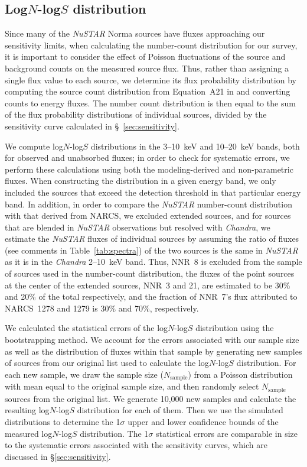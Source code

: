 \documentclass[iop,revtex4]{emulateapj}
\begin{document}
\subsection{Log$N$-log$S$ distribution}
\label{sec:lognlogs}
Since many of the \textit{NuSTAR} Norma sources have fluxes approaching our sensitivity limits, when calculating the number-count distribution for our survey, it is important to consider the effect of Poisson fluctuations of the source and background counts on the measured source flux.  Thus, rather than assigning a single flux value to each source, we determine its flux probability distribution by computing the source count distribution from Equation~A21 in \citet{weiss07} and converting counts to energy fluxes.  The number count distribution is then equal to the sum of the flux probability distributions of individual sources, divided by the sensitivity curve calculated in \S~\ref{sec:sensitivity}.  \par
We compute log$N$-log$S$ distributions in the 3--10~keV and 10--20~keV bands, both for observed and unabsorbed fluxes; in order to check for systematic errors, we perform these calculations using both the modeling-derived and non-parametric fluxes.  When constructing the distribution in a given energy band, we only included the sources that exceed the detection threshold in that particular energy band.  In addition, in order to compare the \textit{NuSTAR} number-count distribution with that derived from NARCS, we excluded extended sources, and for sources that are blended in \textit{NuSTAR} observations but resolved with \textit{Chandra}, we estimate the \textit{NuSTAR} fluxes of individual sources by assuming the ratio of fluxes (see comments in Table~\ref{tab:spectra}) of the two sources is the same in \textit{NuSTAR} as it is in the \textit{Chandra} 2--10~keV band.  Thus, NNR~8 is excluded from the sample of sources used in the number-count distribution, the fluxes of the point sources at the center of the extended sources, NNR~3 and 21, are estimated to be 30\% and 20\% of the total respectively, and the fraction of NNR~7's flux attributed to NARCS~1278 and 1279 is 30\% and 70\%, respectively. \par
We calculated the statistical errors of the log$N$-log$S$ distribution using the bootstrapping method.  We account for the errors associated with our sample size as well as the distribution of fluxes within that sample by generating new samples of sources from our original list used to calculate the log$N$-log$S$ distribution.  For each new sample, we draw the sample size ($N_{\mathrm{sample}}$) from a Poisson distribution with mean equal to the original sample size, and then randomly select $N_{\mathrm{sample}}$ sources from the original list.  We generate 10,000 new samples and calculate the resulting log$N$-log$S$ distribution for each of them.  Then we use the simulated distributions to determine the 1$\sigma$ upper and lower confidence bounds of the measured log$N$-log$S$ distribution.  The 1$\sigma$ statistical errors are comparable in size to the systematic errors associated with the sensitivity curves, which are discussed in \S\ref{sec:sensitivity}. \par
\end{document}

